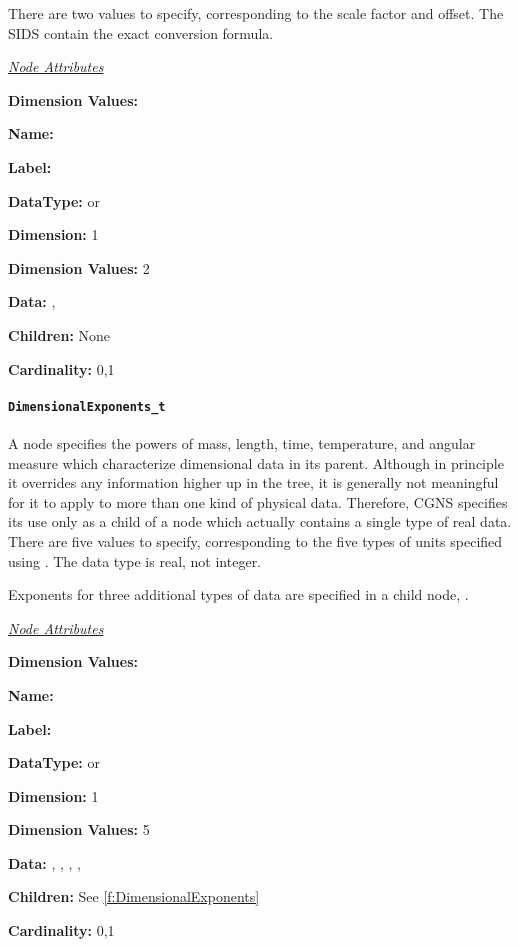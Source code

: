 There are two values to specify, corresponding to the scale factor and
offset. The SIDS contain the exact conversion formula.

\textit{\uline{Node Attributes}}
\begin{Ventryic}{\textbf{Dimension Values:}}
\item [\textbf{Name:}]
\item [\textbf{Label:}]
\item [\textbf{DataType:}]
       or 
\item [\textbf{Dimension:}]
      1
\item [\textbf{Dimension Values:}]
      2
\item [\textbf{Data:}]
      , 
\item [\textbf{Children:}]
      None
\item [\textbf{Cardinality:}]
      0,1
\end{Ventryic}

\paragraph{\texttt{DimensionalExponents\_t}}

A  node specifies the powers of mass,
length, time, temperature, and angular measure which characterize
dimensional data in its parent. Although in principle it overrides any
 information higher up in the tree, it
is generally not meaningful for it to apply to more than one kind of
physical data. Therefore, CGNS specifies its use only as a child of
a node which actually contains a single type of real data.
There are five values to specify, corresponding to the five types of
units specified using .
The data type is real, not integer.

Exponents for three additional types of data are specified in a child node,
.

\textit{\uline{Node Attributes}}
\begin{Ventryic}{\textbf{Dimension Values:}}
\raggedright
\item [\textbf{Name:}]
\item [\textbf{Label:}]
\item [\textbf{DataType:}]
       or 
\item [\textbf{Dimension:}]
      1
\item [\textbf{Dimension Values:}]
      5
\item [\textbf{Data:}]
      , , ,
      , 
\item [\textbf{Children:}]
      See \autoref{f:DimensionalExponents}
\item [\textbf{Cardinality:}]
      0,1
\end{Ventryic}

